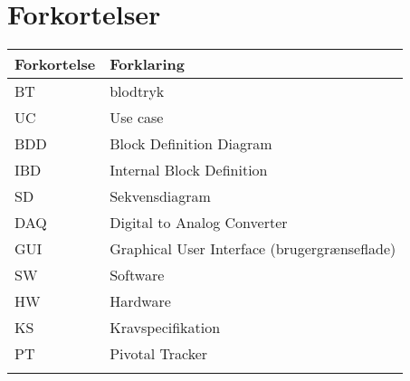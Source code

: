 \chapter{Forkortelser}

\begin{longtabu} to 
    Forkortelse &    Forklaring\\
    \toprule
    BT &    blodtryk\\
    UC	&	Use case\\
    BDD	&	Block Definition Diagram\\
    IBD	&	Internal Block Definition\\
    SD	&	Sekvensdiagram\\
    DAQ	&	Digital to Analog Converter\\
    GUI	&	Graphical User Interface (brugergrænseflade)\\
    SW	&	Software\\
    HW	&	Hardware\\
    KS	&	Kravspecifikation\\
    PT	&	Pivotal Tracker\\
\label{forkort}
\end{longtabu}